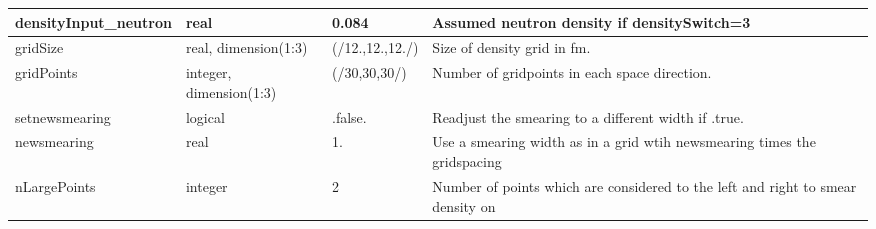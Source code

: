 \documentclass{article}
\begin{document}
\begin{longtable}{llll}
\midrule
densityInput\_neutron & \begin{minipage}[t]{2cm}real\end{minipage} & \begin{minipage}[t]{2cm}0.084\end{minipage} & \begin{minipage}[t]{12cm}Assumed neutron density if densitySwitch=3\end{minipage}\\*
\midrule
gridSize & \begin{minipage}[t]{2cm}real, dimension(1:3)\end{minipage} & \begin{minipage}[t]{2cm}(/12.,12.,12./)\end{minipage} & \begin{minipage}[t]{12cm}Size of density grid in fm.\end{minipage}\\*
\midrule
gridPoints & \begin{minipage}[t]{2cm}integer, dimension(1:3)\end{minipage} & \begin{minipage}[t]{2cm}(/30,30,30/)\end{minipage} & \begin{minipage}[t]{12cm}Number of gridpoints in each space direction.\end{minipage}\\*
\midrule
setnewsmearing & \begin{minipage}[t]{2cm}logical\end{minipage} & \begin{minipage}[t]{2cm}.false.\end{minipage} & \begin{minipage}[t]{12cm}Readjust the smearing to a different width if .true.\end{minipage}\\*
\midrule
newsmearing & \begin{minipage}[t]{2cm}real\end{minipage} & \begin{minipage}[t]{2cm}1.\end{minipage} & \begin{minipage}[t]{12cm}Use a smearing width as in a grid wtih newsmearing times the gridspacing\end{minipage}\\*
\midrule
nLargePoints & \begin{minipage}[t]{2cm}integer\end{minipage} & \begin{minipage}[t]{2cm}2\end{minipage} & \begin{minipage}[t]{12cm}Number of points which are considered to the left and right to smear density on\end{minipage}\\*
\bottomrule
\end{longtable}
{ }
\end{document}
